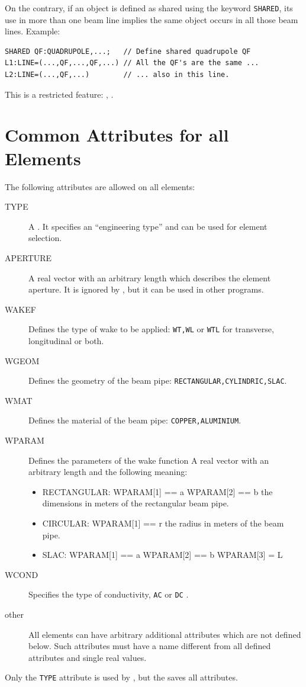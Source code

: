 On the contrary, if an object is defined as shared using the keyword
\texttt{SHARED}, 
its use in more than one beam line implies the same object occurs
in all those beam lines.
Example:
\begin{verbatim}
SHARED QF:QUADRUPOLE,...;   // Define shared quadrupole QF
L1:LINE=(...,QF,...,QF,...) // All the QF's are the same ...
L2:LINE=(...,QF,...)        // ... also in this line.
\end{verbatim}
This is a restricted feature: \noopalt, \noopalcycl.

\section{Common Attributes for all Elements}
\label{sec:common}
The following attributes are allowed on all elements:
\begin{description}
\item[TYPE]
  A .
  It specifies an ``engineering type'' and can be used for element
  selection.
\item[APERTURE]
  A real vector with an arbitrary length which describes
  the element aperture.
  It is ignored by \opal, but it can be used in other programs.
\item[WAKEF]
Defines the type of wake to be applied: \texttt{WT,WL} or \texttt{WTL} for 
transverse, longitudinal or both.
\item[WGEOM]
Defines the geometry of the beam pipe:  \texttt{RECTANGULAR,CYLINDRIC,SLAC}.
\item[WMAT]
Defines the material of the beam pipe:  \texttt{COPPER,ALUMINIUM}.
\item[WPARAM]
Defines the parameters of the wake function A real vector with an arbitrary length and the following meaning:
\begin{itemize}
\item RECTANGULAR: WPARAM[1] == a WPARAM[2] == b the dimensions in meters  of the rectangular beam pipe.
\item CIRCULAR:  WPARAM[1] == r the radius in meters  of the beam pipe.
\item SLAC: WPARAM[1] == a WPARAM[2] == b WPARAM[3] = L 
\end{itemize}
\item[WCOND]
  Specifies the type of conductivity,  \texttt{AC} or \texttt{DC} .
\item[other]
  All elements can have arbitrary additional attributes
  which are not defined below.
  Such attributes must have a name different from all defined attributes
  and single real values.
\end{description}
Only the \texttt{TYPE} attribute is used by \opal,
but the  saves all attributes.

